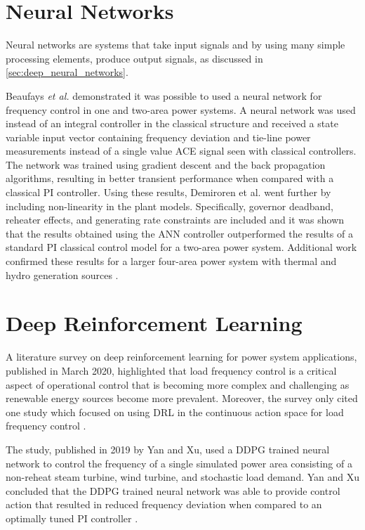 \section{Neural Networks}
Neural networks are systems that take input signals and by using many simple processing elements, produce output signals, as discussed in \textsection \ref{sec:deep_neural_networks}.

Beaufays \textit{et al.} \cite{Beaufays1994} demonstrated it was possible to used a neural network for frequency control in one and two-area power systems. A neural network was used instead of an integral controller in the classical structure and received a state variable input vector containing frequency deviation and tie-line power measurements instead of a single value ACE signal seen with classical controllers. The network was trained using gradient descent and the back propagation algorithms, resulting in better transient performance when compared with a classical PI controller. Using these results, Demiroren et al. \cite{Demiroren2001} went further by including non-linearity in the plant models. Specifically, governor deadband, reheater effects, and generating rate constraints are included and it was shown that the results obtained using the ANN controller outperformed the results of a standard PI classical control model for a two-area power system. Additional work confirmed these results for a larger four-area power system with thermal and hydro generation sources \cite{Zeynelgil2002}.

\section{Deep Reinforcement Learning}
A literature survey on deep reinforcement learning for power system applications, published in March 2020, highlighted that load frequency control is a critical aspect of operational control that is becoming more complex and challenging as renewable energy sources become more prevalent. Moreover, the survey only cited one study which focused on using DRL in the continuous action space for load frequency control \cite{Zhang2019}.

The study, published in 2019 by Yan and Xu, used a DDPG trained neural network to control the frequency of a single simulated power area consisting of a non-reheat steam turbine, wind turbine, and stochastic load demand. Yan and Xu concluded that the DDPG trained neural network was able to provide control action that resulted in reduced frequency deviation when compared to an optimally tuned PI controller \cite{Yan2019}.



